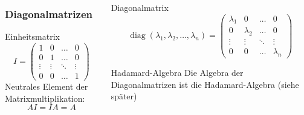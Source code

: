 %
%
%
\begin{frame}[t]
\begin{columns}[t,onlytextwidth]
\begin{column}{0.38\textwidth}
\frametitle{Diagonalmatrizen}
\begin{block}{Einheitsmatrix}
\[
I=\begin{pmatrix}
1&0&\dots&0\\
0&1&\dots&0\\
\vdots&\vdots&\ddots&\vdots\\
0&0&\dots&1
\end{pmatrix}
\]
Neutrales Element der Matrixmultiplikation:
\[
AI=IA=A
\]
\end{block}
\end{column}
\begin{column}{0.58\textwidth}
\begin{block}{Diagonalmatrix}
\[
\operatorname{diag}(\lambda_1,\lambda_2,\dots,\lambda_n)
=
\begin{pmatrix}
\lambda_1&0&\dots&0\\
0&\lambda_2&\dots&0\\
\vdots&\vdots&\ddots&\vdots\\
0&0&\dots&\lambda_n
\end{pmatrix}
\]
\end{block}
\begin{block}{Hadamard-Algebra}
Die Algebra der Diagonalmatrizen ist die Hadamard-Algebra
(siehe später)
\end{block}
\end{column}
\end{columns}
\end{frame}
